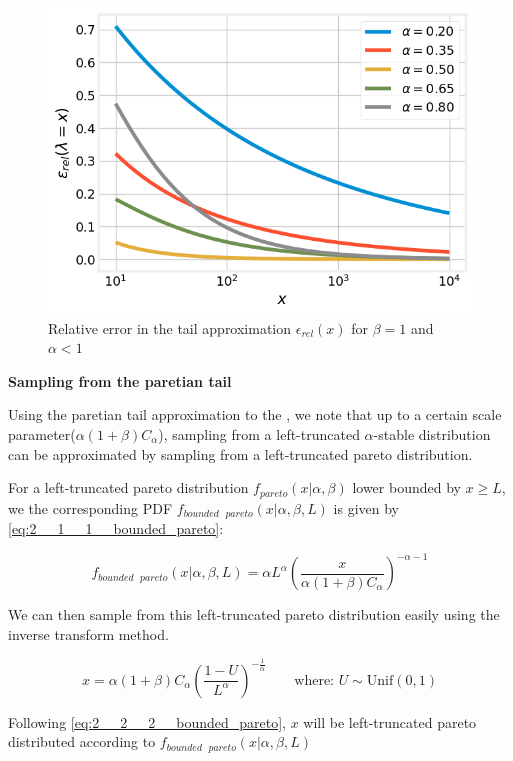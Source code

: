 \documentclass[../main.tex]{subfiles}
\begin{document}
\begin{figure}[h!]
	\centering
	\includegraphics[width=12.0cm]{../plots/2__1__1__tail_approx.png}
	\caption{Relative error in the tail approximation $\epsilon_{rel}(x)$ for $\beta = 1$ and $\alpha < 1$}
	\label{fig:2__1__1__tail_approx}
\end{figure}

\textbf{Sampling from the paretian tail}

Using the paretian tail approximation to the \asd, we note that up to a certain scale parameter($\alpha (1+\beta) C_\alpha$), sampling from a left-truncated $\alpha$-stable distribution can be approximated by sampling from a left-truncated pareto distribution. 

For a left-truncated pareto distribution $f_{pareto}(x | \alpha, \beta)$ lower bounded by $x \geq L$, we the corresponding PDF $f_{bounded \text{ }pareto}(x | \alpha, \beta, L)$ is given by \autoref{eq:2__1__1__bounded_pareto}:

\begin{equation}
	f_{bounded \text{ }pareto}(x | \alpha, \beta, L) =  \alpha L^\alpha \left(\frac{x}{\alpha (1+\beta) C_\alpha}\right)^{-\alpha -1} \label{eq:2__1__1__bounded_pareto}
\end{equation}

We can then sample from this left-truncated pareto distribution easily using the inverse transform method. 

\begin{equation}
x = \alpha (1+\beta) C_\alpha \left( \frac{1-U }{L^\alpha} \right) ^ {-\frac{1}{\alpha}}  \qquad \text{where: } U \sim \text{Unif}(0,1)
\label{eq:2__2__2__bounded_pareto}
\end{equation}

Following \autoref{eq:2__2__2__bounded_pareto}, $x$ will be left-truncated pareto distributed according to $f_{bounded \text{ }pareto}(x | \alpha, \beta, L)$ 
	
\end{document}
